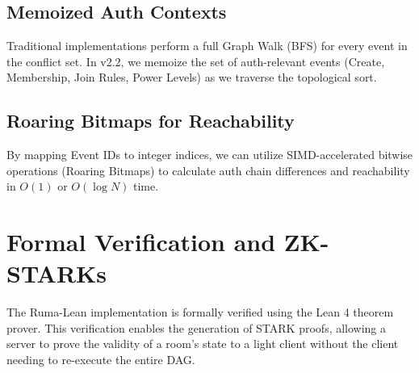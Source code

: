 \documentclass[11pt,a4paper]{article}
\begin{document}
\subsection{Memoized Auth Contexts}
Traditional implementations perform a full Graph Walk (BFS) for every event in the conflict set. In v2.2, we memoize the set of auth-relevant events (Create, Membership, Join Rules, Power Levels) as we traverse the topological sort.

\subsection{Roaring Bitmaps for Reachability}
By mapping Event IDs to integer indices, we can utilize SIMD-accelerated bitwise operations (Roaring Bitmaps) to calculate auth chain differences and reachability in $O(1)$ or $O(\log N)$ time.

\section{Formal Verification and ZK-STARKs}
The Ruma-Lean implementation is formally verified using the Lean 4 theorem prover. This verification enables the generation of STARK proofs, allowing a server to prove the validity of a room's state to a light client without the client needing to re-execute the entire DAG.
\end{document}

